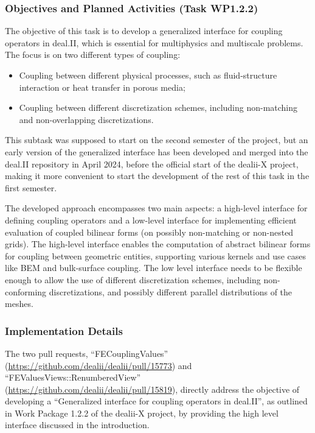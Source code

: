 \documentclass[a4paper,12pt]{article}
\begin{document}
    \subsubsection{Objectives and Planned Activities (Task WP1.2.2)}

    The objective of this task is to develop a generalized interface for
    coupling operators in deal.II, which is essential for multiphysics and
    multiscale problems. The focus is on two different types of coupling:
    \begin{itemize}
        \item Coupling between different physical processes, such as fluid-structure interaction or heat transfer in porous media;
        \item Coupling between different discretization schemes, including
        non-matching and non-overlapping discretizations.
    \end{itemize}

    This subtask was supposed to start on the second semester of the project,
    but an early version of the generalized interface has been developed and
    merged into the deal.II repository in April 2024, before the official start
    of the dealii-X project, making it more convenient to start the development
    of the rest of this task in the first semester.

    The developed approach encompasses two main aspects: a high-level interface
    for defining coupling operators and a low-level interface for implementing
    efficient evaluation of coupled bilinear forms (on possibly non-matching or
    non-nested grids). The high-level interface enables the computation of
    abstract bilinear forms for coupling between geometric entities, supporting
    various kernels and use cases like BEM and bulk-surface coupling. The low
    level interface needs to be flexible enough to allow the use of different
    discretization schemes, including non-conforming discretizations, and
    possibly different parallel distributions of the meshes.

    \subsubsection{Implementation Details} 

    The two pull requests, ``FECouplingValues''
    (\url{https://github.com/dealii/dealii/pull/15773}) and
    ``FEValuesViews::RenumberedView''
    (\url{https://github.com/dealii/dealii/pull/15819}), directly address the
    objective of developing a ``Generalized interface for coupling operators in
    deal.II'', as outlined in Work Package 1.2.2 of the dealii-X project, by
    providing the high level interface discussed in the introduction.
\end{document}
